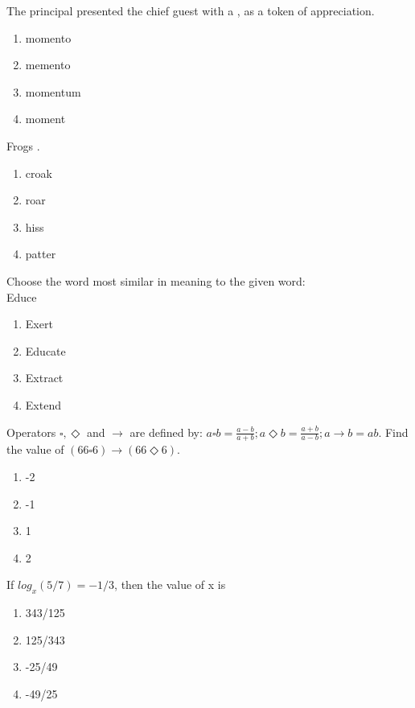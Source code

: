 \iffalse
\author{EE24BTECH11047}
\section{xe}
\chapter{2015}
\fi
\item The principal presented the chief guest with a \underline{\hspace{1cm}}, as a token of appreciation.
\begin{enumerate}
    \item momento
    \item memento
    \item momentum
    \item moment
\end{enumerate}
\item Frogs \underline{\hspace{1cm}}.
\begin{enumerate}
    \item croak
    \item roar
    \item hiss
    \item patter
\end{enumerate}
\item Choose the word most similar in meaning to the given word:\\
Educe
\begin{enumerate}
    \item Exert
    \item Educate
    \item Extract
    \item Extend
\end{enumerate}
\item Operators $\square, \Diamond$ and $\rightarrow$ are defined by: $a\square b=\frac{a-b}{a+b};a\Diamond b=\frac{a+b}{a-b};a\rightarrow b=ab$. Find the value of $(66\square 6)\rightarrow(66\Diamond 6)$.
\begin{enumerate}
    \item -2
    \item -1
    \item 1
    \item 2
\end{enumerate}
\item If $log_{x}(5/7)=-1/3$, then the value of x is
\begin{enumerate}
    \item 343/125
    \item 125/343
    \item -25/49
    \item -49/25
\end{enumerate}
